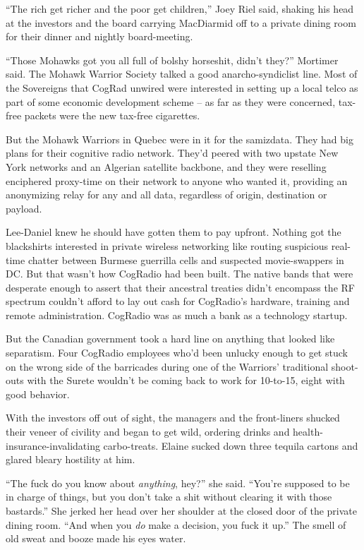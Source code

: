 “The rich get richer and the poor get children,” Joey Riel said, 
shaking his head at the investors and the board carrying MacDiarmid off 
to a private dining room for their dinner and nightly board-meeting.

“Those Mohawks got you all full of bolshy horseshit, didn't they?” 
Mortimer said. The Mohawk Warrior Society talked a good 
anarcho-syndiclist line. Most of the Sovereigns that CogRad unwired 
were interested in setting up a local telco as part of some economic 
development scheme -- as far as they were concerned, tax-free packets 
were the new tax-free cigarettes.

But the Mohawk Warriors in Quebec were in it for the samizdata. They 
had big plans for their cognitive radio network. They'd peered with two 
upstate New York networks and an Algerian satellite backbone, and they 
were reselling enciphered proxy-time on their network to anyone who 
wanted it, providing an anonymizing relay for any and all data, 
regardless of origin, destination or payload.

Lee-Daniel knew he should have gotten them to pay upfront. Nothing got 
the blackshirts interested in private wireless networking like routing 
suspicious real-time chatter between Burmese guerrilla cells and 
suspected movie-swappers in DC. But that wasn't how CogRadio had been 
built. The native bands that were desperate enough to assert that their 
ancestral treaties didn't encompass the RF spectrum couldn't afford to 
lay out cash for CogRadio's hardware, training and remote 
administration. CogRadio was as much a bank as a technology startup.

But the Canadian government took a hard line on anything that looked 
like separatism. Four CogRadio employees who'd been unlucky enough to 
get stuck on the wrong side of the barricades during one of the 
Warriors' traditional shoot-outs with the Surete wouldn't be coming 
back to work for 10-to-15, eight with good behavior.

With the investors off out of sight, the managers and the front-liners 
shucked their veneer of civility and began to get wild, ordering drinks 
and health-insurance-invalidating carbo-treats. Elaine sucked down 
three tequila cartons and glared bleary hostility at him.

“The fuck do you know about \emph{anything}, hey?” she said. 
“You're supposed to be in charge of things, but you don't take a shit 
without clearing it with those bastards.” She jerked her head over 
her shoulder at the closed door of the private dining room. “And when 
you \emph{do} make a decision, you fuck it up.” The smell of old 
sweat and booze made his eyes water.

